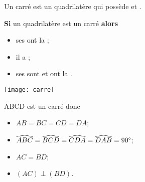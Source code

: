 \begin{mydef}
	Un carré est un quadrilatère qui possède  et .
\end{mydef}

\begin{myprops}
	\textbf{Si} un quadrilatère est un carré \textbf{alors} 
	\begin{itemize}
		\item ses  ont la ;
		\item il a ;
		\item ses  sont  et ont la .
	\end{itemize}
\end{myprops}

\begin{myex}
	\begin{center}
		\texttt{[image: carre]}
	\end{center}

	ABCD est un carré donc \begin{itemize}
		\item $AB = BC = CD = DA$;
		\item  $\widehat{ABC} = \widehat{BCD} = \widehat{CDA} = \widehat{DAB} = 90\degree$;
		\item $AC = BD $;
		\item $(AC) \perp (BD)$.
	\end{itemize}
\end{myex}
